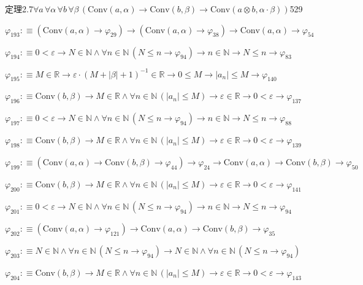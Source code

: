 \begin{fullproof}{定理2.7}{$\forall a\,\forall \alpha\,\forall b\,\forall \beta\,(\mathrm{Conv}(a,\alpha) \to \mathrm{Conv}(b,\beta) \to \mathrm{Conv}(a \otimes b,\alpha \cdot \beta))$}{529}
\begin{abbrevlist}
\item $\varphi_{193} :\equiv (\mathrm{Conv}(a,\alpha) \to \varphi_{29}) \to (\mathrm{Conv}(a,\alpha) \to \varphi_{38}) \to \mathrm{Conv}(a,\alpha) \to \varphi_{54}$
\item $\varphi_{194} :\equiv 0 < \varepsilon \to N \in \mathbb{N} \land \forall n \in \mathbb{N}\,(N \leq n \to \varphi_{94}) \to n \in \mathbb{N} \to N \leq n \to \varphi_{83}$
\item $\varphi_{195} :\equiv M \in \mathbb{R} \to \varepsilon \cdot (M + \lvert \beta \rvert + 1)^{-1} \in \mathbb{R} \to 0 \leq M \to \lvert a_{n} \rvert \leq M \to \varphi_{140}$
\item $\varphi_{196} :\equiv \mathrm{Conv}(b,\beta) \to M \in \mathbb{R} \land \forall n \in \mathbb{N}\,(\lvert a_{n} \rvert \leq M) \to \varepsilon \in \mathbb{R} \to 0 < \varepsilon \to \varphi_{137}$
\item $\varphi_{197} :\equiv 0 < \varepsilon \to N \in \mathbb{N} \land \forall n \in \mathbb{N}\,(N \leq n \to \varphi_{94}) \to n \in \mathbb{N} \to N \leq n \to \varphi_{88}$
\item $\varphi_{198} :\equiv \mathrm{Conv}(b,\beta) \to M \in \mathbb{R} \land \forall n \in \mathbb{N}\,(\lvert a_{n} \rvert \leq M) \to \varepsilon \in \mathbb{R} \to 0 < \varepsilon \to \varphi_{139}$
\item $\varphi_{199} :\equiv (\mathrm{Conv}(a,\alpha) \to \mathrm{Conv}(b,\beta) \to \varphi_{44}) \to \varphi_{24} \to \mathrm{Conv}(a,\alpha) \to \mathrm{Conv}(b,\beta) \to \varphi_{50}$
\item $\varphi_{200} :\equiv \mathrm{Conv}(b,\beta) \to M \in \mathbb{R} \land \forall n \in \mathbb{N}\,(\lvert a_{n} \rvert \leq M) \to \varepsilon \in \mathbb{R} \to 0 < \varepsilon \to \varphi_{141}$
\item $\varphi_{201} :\equiv 0 < \varepsilon \to N \in \mathbb{N} \land \forall n \in \mathbb{N}\,(N \leq n \to \varphi_{94}) \to n \in \mathbb{N} \to N \leq n \to \varphi_{94}$
\item $\varphi_{202} :\equiv (\mathrm{Conv}(a,\alpha) \to \varphi_{121}) \to \mathrm{Conv}(a,\alpha) \to \mathrm{Conv}(b,\beta) \to \varphi_{35}$
\item $\varphi_{203} :\equiv N \in \mathbb{N} \land \forall n \in \mathbb{N}\,(N \leq n \to \varphi_{94}) \to N \in \mathbb{N} \land \forall n \in \mathbb{N}\,(N \leq n \to \varphi_{94})$
\item $\varphi_{204} :\equiv \mathrm{Conv}(b,\beta) \to M \in \mathbb{R} \land \forall n \in \mathbb{N}\,(\lvert a_{n} \rvert \leq M) \to \varepsilon \in \mathbb{R} \to 0 < \varepsilon \to \varphi_{143}$

\end{abbrevlist}
\end{fullproof}
